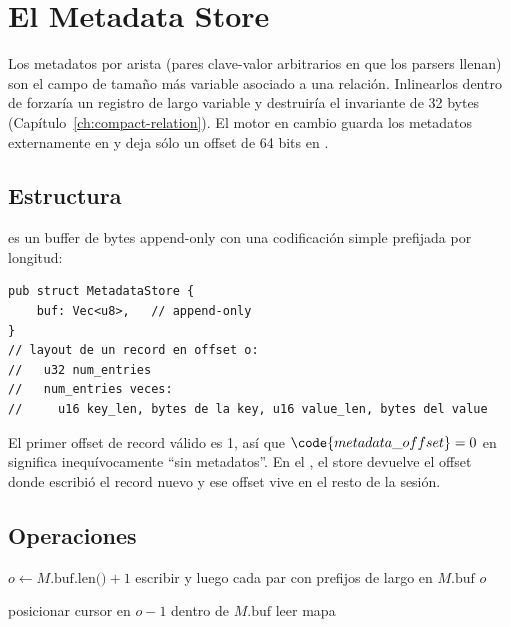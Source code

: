 \chapter{El Metadata Store}
\label{ch:metadata}

Los metadatos por arista (pares clave-valor arbitrarios en
 que los parsers llenan) son el
campo de tamaño más variable asociado a una relación. Inlinearlos
dentro de \Compact{} forzaría un registro de largo variable y
destruiría el invariante de 32 bytes
(Capítulo~\ref{ch:compact-relation}). El motor en cambio guarda
los metadatos externamente en  y deja sólo un
offset de 64 bits en \Compact{}.

\section{Estructura}

 es un buffer de bytes append-only con una
codificación simple prefijada por longitud:

\begin{lstlisting}[style=rust]
pub struct MetadataStore {
    buf: Vec<u8>,   // append-only
}
// layout de un record en offset o:
//   u32 num_entries
//   num_entries veces:
//     u16 key_len, bytes de la key, u16 value_len, bytes del value
\end{lstlisting}

El primer offset de record válido es 1, así que
$\code{metadata\_offset} = 0$ en \Compact{} significa
inequívocamente ``sin metadatos''. En el , el store
devuelve el offset donde escribió el record nuevo y ese offset
vive en \Compact{} el resto de la sesión.

\section{Operaciones}

\begin{algorithm}
\caption{\textsc{Metadata-Append}}\label{alg:meta-append}
$o \gets M.\text{buf.len()} + 1$\;
escribir  y luego cada par 
con prefijos de largo  en $M.\text{buf}$\;
\Return $o$\;
\end{algorithm}

\begin{algorithm}
\caption{\textsc{Metadata-Read}}\label{alg:meta-read}
posicionar cursor en $o - 1$ dentro de $M.\text{buf}$\;
leer \;
\Return mapa\;
\end{algorithm}

